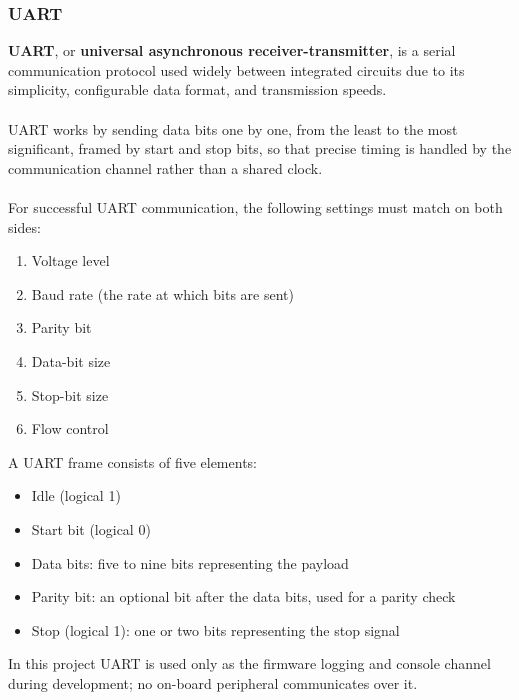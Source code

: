\documentclass[12pt, a4paper]{article}
\begin{document}
\subsubsection{UART}
\textbf{UART}, or \textbf{universal asynchronous receiver-transmitter}, is a
serial communication protocol used widely between integrated circuits due to its
simplicity, configurable data format, and transmission speeds.\\\\
UART works by sending data bits one by one, from the least to the most significant, framed by
start and stop bits, so that precise timing is handled by the communication
channel rather than a shared clock.\\\\
For successful UART communication, the following settings must match on both
sides:
\begin{enumerate}
    \item Voltage level
    \item Baud rate (the rate at which bits are sent)
    \item Parity bit
    \item Data-bit size
    \item Stop-bit size
    \item Flow control
\end{enumerate}
A UART frame consists of five elements:
\begin{itemize}
    \item Idle (logical 1)
    \item Start bit (logical 0)
    \item Data bits: five to nine bits representing the payload
    \item Parity bit: an optional bit after the data bits, used for a parity check
    \item Stop (logical 1): one or two bits representing the stop signal
\end{itemize}
In this project UART is used only as the firmware logging and console channel
during development; no on-board peripheral communicates over it.
\end{document}
